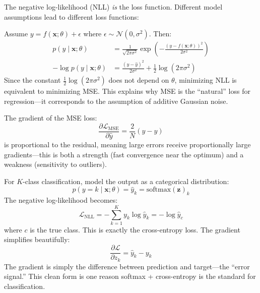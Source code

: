 The negative log-likelihood (NLL) \emph{is} the loss function. Different model assumptions lead to different loss functions:

\begin{example}
Assume $y = f(\mathbf{x}; \theta) + \epsilon$ where $\epsilon \sim \mathcal{N}(0, \sigma^2)$. Then:
\begin{align}
p(y \mid \mathbf{x}; \theta) &= \frac{1}{\sqrt{2\pi\sigma^2}} \exp\left(-\frac{(y - f(\mathbf{x};\theta))^2}{2\sigma^2}\right) \\
-\log p(y \mid \mathbf{x}; \theta) &= \frac{(y - \hat{y})^2}{2\sigma^2} + \frac{1}{2}\log(2\pi\sigma^2)
\end{align}
Since the constant $\frac{1}{2}\log(2\pi\sigma^2)$ does not depend on $\theta$, minimizing NLL is equivalent to minimizing MSE. This explains why MSE is the ``natural'' loss for regression---it corresponds to the assumption of additive Gaussian noise.

The gradient of the MSE loss:
\begin{equation}
\frac{\partial \mathcal{L}_{\text{MSE}}}{\partial \hat{y}} = \frac{2}{N}(\hat{y} - y)
\end{equation}
is proportional to the residual, meaning large errors receive proportionally large gradients---this is both a strength (fast convergence near the optimum) and a weakness (sensitivity to outliers).
\end{example}

\begin{example}
For $K$-class classification, model the output as a categorical distribution:
\begin{equation}
p(y = k \mid \mathbf{x}; \theta) = \hat{y}_k = \text{softmax}(\mathbf{z})_k
\end{equation}
The negative log-likelihood becomes:
\begin{equation}
\mathcal{L}_{\text{NLL}} = -\sum_{k=1}^{K} y_k \log \hat{y}_k = -\log \hat{y}_{c}
\end{equation}
where $c$ is the true class. This is exactly the cross-entropy loss. The gradient simplifies beautifully:
\begin{equation}
\frac{\partial \mathcal{L}}{\partial z_k} = \hat{y}_k - y_k
\end{equation}
The gradient is simply the difference between prediction and target---the ``error signal.'' This clean form is one reason softmax + cross-entropy is the standard for classification.
\end{example}

